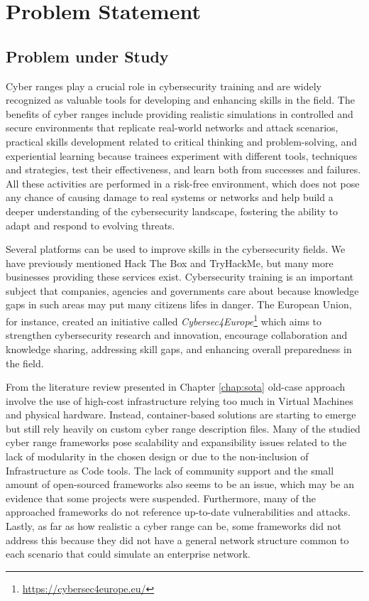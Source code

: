 \chapter{Problem Statement}\label{chap:problem_statement}

\minitoc

\section{Problem under Study} \label{sec:research_problem}

Cyber ranges play a crucial role in cybersecurity training and are widely recognized as valuable tools for developing and enhancing skills in the field. The benefits of cyber ranges include providing realistic simulations in controlled and secure environments that replicate real-world networks and attack scenarios, practical skills development related to critical thinking and problem-solving, and experiential learning because trainees experiment with different tools, techniques and strategies, test their effectiveness, and learn both from successes and failures. All these activities are performed in a risk-free environment, which does not pose any chance of causing damage to real systems or networks and help build a deeper understanding of the cybersecurity landscape, fostering the ability to adapt and respond to evolving threats. 

Several platforms can be used to improve skills in the cybersecurity fields. We have previously mentioned Hack The Box and TryHackMe, but many more businesses providing these services exist. Cybersecurity training is an important subject that companies, agencies and governments care about because knowledge gaps in such areas may put many citizens lifes in danger. The European Union, for instance, created an initiative called \textit{Cybersec4Europe}\footnote{\url{https://cybersec4europe.eu/}} which aims to strengthen cybersecurity research and innovation, encourage collaboration and knowledge sharing, addressing skill gaps, and enhancing overall preparedness in the field. 

From the literature review presented in Chapter \ref{chap:sota} old-case approach involve the use of high-cost infrastructure relying too much in Virtual Machines and physical hardware. Instead, container-based solutions are starting to emerge but still rely heavily on custom cyber range description files. Many of the studied cyber range frameworks pose scalability and expansibility issues related to the lack of modularity in the chosen design or due to the non-inclusion of Infrastructure as Code tools. The lack of community support and the small amount of open-sourced frameworks also seems to be an issue, which may be an evidence that some projects were suspended. Furthermore, many of the approached frameworks do not reference up-to-date vulnerabilities and attacks. Lastly, as far as how realistic a cyber range can be, some frameworks did not address this because they did not have a general network structure common to each scenario that could simulate an enterprise network. 

